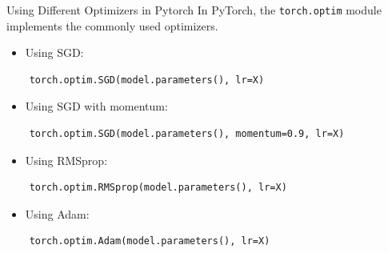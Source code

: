 \begin{frame}[allowframebreaks]

\begin{myconceptblock}{6.26}{Using Different Optimizers in Pytorch}
    In PyTorch, the \verb|torch.optim| module implements the commonly used optimizers.

    \begin{itemize}
        \item Using SGD:
    \end{itemize}

    \begin{verbatim}
    torch.optim.SGD(model.parameters(), lr=X)
    \end{verbatim}

    \begin{itemize}
        \item Using SGD with momentum:
    \end{itemize}

    \begin{verbatim}
    torch.optim.SGD(model.parameters(), momentum=0.9, lr=X)
    \end{verbatim}

    \begin{itemize}
        \item Using RMSprop:
    \end{itemize}

    \begin{verbatim}
    torch.optim.RMSprop(model.parameters(), lr=X)
    \end{verbatim}

    \begin{itemize}
        \item Using Adam:
    \end{itemize}

    \begin{verbatim}
    torch.optim.Adam(model.parameters(), lr=X)
    \end{verbatim}
\end{myconceptblock}

\end{frame}

